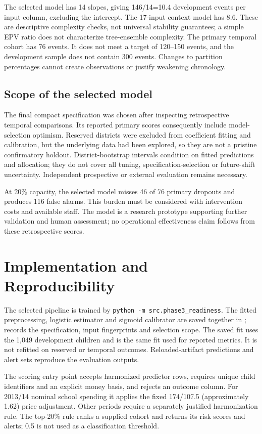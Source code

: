 \documentclass[conference,a4paper]{IEEEtran}
\begin{document}
The selected model has 14 slopes, giving 146/14=10.4 development events per input column, excluding the intercept. The 17-input context model has 8.6. These are descriptive complexity checks, not universal stability guarantees; a simple EPV ratio does not characterize tree-ensemble complexity. The primary temporal cohort has 76 events. It does not meet a target of 120--150 events, and the development sample does not contain 300 events. Changes to partition percentages cannot create observations or justify weakening chronology.

\subsection{\textbf{Scope of the selected model}}
The final compact specification was chosen after inspecting retrospective temporal comparisons. Its reported primary scores consequently include model-selection optimism. Reserved districts were excluded from coefficient fitting and calibration, but the underlying data had been explored, so they are not a pristine confirmatory holdout. District-bootstrap intervals condition on fitted predictions and allocation; they do not cover all tuning, specification-selection or future-shift uncertainty. Independent prospective or external evaluation remains necessary.

At 20\% capacity, the selected model misses 46 of 76 primary dropouts and produces 116 false alarms. This burden must be considered with intervention costs and available staff. The model is a research prototype supporting further validation and human assessment; no operational effectiveness claim follows from these retrospective scores.

\section{\textbf{Implementation and Reproducibility}}
The selected pipeline is trained by \texttt{python -m src.phase3\_readiness}. The fitted preprocessing, logistic estimator and sigmoid calibrator are saved together in ;  records the specification, input fingerprints and selection scope. The saved fit uses the 1,049 development children and is the same fit used for reported metrics. It is not refitted on reserved or temporal outcomes. Reloaded-artifact predictions and alert sets reproduce the evaluation outputs.

The scoring entry point  accepts harmonized predictor rows, requires unique child identifiers and an explicit money basis, and rejects an outcome column. For 2013/14 nominal school spending it applies the fixed 174/107.5 (approximately 1.62) price adjustment. Other periods require a separately justified harmonization rule. The top-20\% rule ranks a supplied cohort and returns its risk scores and alerts; 0.5 is not used as a classification threshold.
\end{document}
